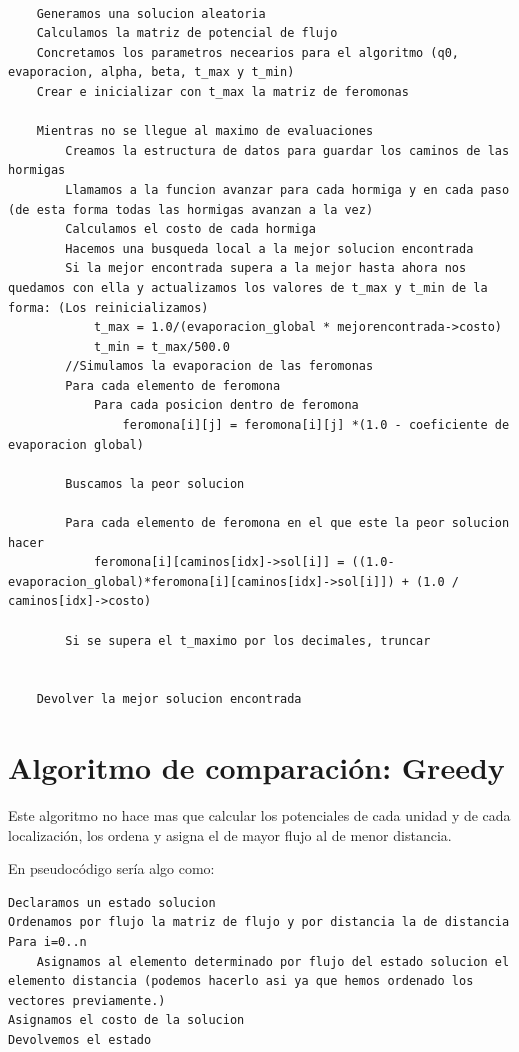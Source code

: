 \begin{lstlisting}[language=SH]
	
	Generamos una solucion aleatoria
	Calculamos la matriz de potencial de flujo
	Concretamos los parametros necearios para el algoritmo (q0, evaporacion, alpha, beta, t_max y t_min)
	Crear e inicializar con t_max la matriz de feromonas
	
	Mientras no se llegue al maximo de evaluaciones
		Creamos la estructura de datos para guardar los caminos de las hormigas
		Llamamos a la funcion avanzar para cada hormiga y en cada paso (de esta forma todas las hormigas avanzan a la vez)
		Calculamos el costo de cada hormiga
		Hacemos una busqueda local a la mejor solucion encontrada
		Si la mejor encontrada supera a la mejor hasta ahora nos quedamos con ella y actualizamos los valores de t_max y t_min de la forma: (Los reinicializamos)
			t_max = 1.0/(evaporacion_global * mejorencontrada->costo)
			t_min = t_max/500.0
		//Simulamos la evaporacion de las feromonas
		Para cada elemento de feromona
			Para cada posicion dentro de feromona
				feromona[i][j] = feromona[i][j] *(1.0 - coeficiente de evaporacion global)
		
		Buscamos la peor solucion
		
		Para cada elemento de feromona en el que este la peor solucion hacer
			feromona[i][caminos[idx]->sol[i]] = ((1.0-evaporacion_global)*feromona[i][caminos[idx]->sol[i]]) + (1.0 / caminos[idx]->costo)
		
		Si se supera el t_maximo por los decimales, truncar
		
		
	Devolver la mejor solucion encontrada
	\end{lstlisting}
		
		
		
		
\newpage
\section{Algoritmo de comparación: Greedy}
Este algoritmo no hace mas que calcular los potenciales de cada unidad y de cada localización, los ordena y asigna el de mayor flujo al de menor distancia.

En pseudocódigo sería algo como:

\begin{lstlisting}[language=SH]
Declaramos un estado solucion
Ordenamos por flujo la matriz de flujo y por distancia la de distancia
Para i=0..n
	Asignamos al elemento determinado por flujo del estado solucion el elemento distancia (podemos hacerlo asi ya que hemos ordenado los vectores previamente.)
Asignamos el costo de la solucion
Devolvemos el estado

\end{lstlisting}


